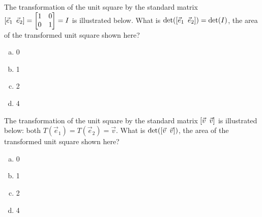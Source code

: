 \begin{activity}{2}
The transformation of the unit square by the
standard matrix \([\vec{e}_1\hspace{0.5em} \vec{e}_2]=\begin{bmatrix}1&0\\0&1\end{bmatrix}=I\) is illustrated below.
What is \(\det([\vec{e}_1\hspace{0.5em} \vec{e}_2])=\det(I)\), the
area of the transformed unit square shown here?
\begin{center}
\end{center}
  \begin{enumerate}[a)]
    \item 0
    \item 1
    \item 2
    \item 4
  \end{enumerate}
\end{activity}

\begin{activity}{2}
The transformation of the unit square by the
standard matrix \([\vec{v}\hspace{0.5em} \vec{v}]\) is illustrated below: both
\(T(\vec{e}_1)=T(\vec{e}_2)=\vec{v}\).
What is \(\det([\vec{v}\hspace{0.5em} \vec{v}])\), 
the area of the transformed unit square shown here?
\begin{center}
\end{center}
  \begin{enumerate}[a)]
    \item 0
    \item 1
    \item 2
    \item 4
  \end{enumerate}
\end{activity}


